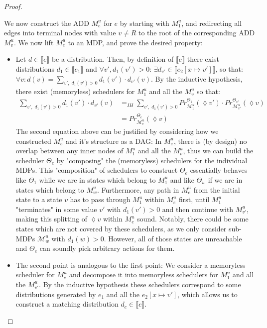 \begin{proof}
\begin{itemize}
		We now construct the ADD $M^ u_e$ for $e$ by starting with $M^u_1$, and redirecting all edges into terminal nodes with value $v \neq R$ to the root of the corresponding ADD $M^u_v$.
		We now lift $M^u_e$ to an MDP, and prove the desired property:
		\begin{itemize}
			\item Let $d \in \llbracket e \rrbracket$ be a distribution. 
			Then, by definition of $\llbracket e \rrbracket$ there exist distributions $d_1 \in \llbracket e_1 \rrbracket$ and $\forall v', d_1(v') > 0: \,\exists d_{v'} \in \llbracket e_2[x \mapsto v'] \rrbracket$, so that:
			$ \forall v : d(v) = \sum\limits_{v',\;d_1(v') > 0} d_1(v') \cdot d_{v'}(v) $.
			By the inductive hypothesis, there exist (memoryless) schedulers for $M^u_1$ and all the $M^u_v$ so that:
			\begin{align*}
				\sum\limits_{v',\;d_1(v') > 0} d_1(v') \cdot d_{v'}(v) &=_{IH} \sum\limits_{v',\;d_1(v') > 0} Pr^{\Theta_1}_{\mathcal{M}^u_1}(\lozenge v') \cdot Pr^{\Theta_{v'}}_{\mathcal{M}^u_{v'}}(\lozenge v)\\
				&= Pr^{\Theta_e}_{\mathcal{M}^u_e}(\lozenge v)
			\end{align*}
			The second equation above can be justified by considering how we constructed $M^u_e$ and it's structure as a DAG:
			In $M^u_e$, there is (by design) no overlap between any inner nodes of $M^u_1$ and all the $M^u_v$, thus we can build the scheduler $\Theta_e$ by "composing" the (memoryless) schedulers for the individual MDPs.
			This "composition" of schedulers to construct $\Theta_e$ essentially behaves like $\Theta_1$ while we are in states which belong to $M^u_1$ and like $\Theta_w$ if we are in states which belong to $M^u_w$.
			Furthermore, any path in $M^u_e$ from the initial state to a state $v$ has to pass through $M^u_1$ within $M^u_e$ first, until $M^u_1$ "terminates" in some value $v'$ with $d_1(v') > 0$ and then continue with $M^u_{v'}$, making this splitting of $\lozenge v$ within $M^u_e$ sound.
			Notably, there could be some states which are not covered by these schedulers, as we only consider sub-MDPs $\mathcal{M}^u_{w}$ with $d_1(w) > 0$.
			However, all of those states are unreachable and $\Theta_e$ can soundly pick arbitrary actions for them.
			\item The second point is analogous to the first point: 
			We consider a memoryless scheduler for $M^u_e$ and decompose it into memoryless schedulers for $M^u_1$ and all the $M^u_{v'}$.
			By the inductive hypothesis these schedulers correspond to some distributions generated by $e_1$ and all the $e_2[x \mapsto v']$, which allows us to construct a matching distribution $d_e \in  \llbracket e\rrbracket$.\\
		\end{itemize}
		

\end{itemize}
\end{proof}
